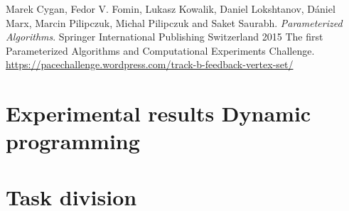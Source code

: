 \documentclass[a4paper,10pt]{article}
\begin{document}

\begin{thebibliography}{9}
 Marek Cygan, Fedor V. Fomin, Lukasz Kowalik, Daniel Lokshtanov, Dániel Marx, Marcin Pilipczuk, Michal Pilipczuk and Saket Saurabh. \textit{Parameterized Algorithms}. Springer International Publishing Switzerland 2015
 The first Parameterized Algorithms and Computational Experiments Challenge. \url{https://pacechallenge.wordpress.com/track-b-feedback-vertex-set/}
\end{thebibliography}

\clearpage
\appendix

%

\FloatBarrier
\section{Experimental results Dynamic programming} \label{app:dynamicprogram}


\FloatBarrier
\section{Task division}

\end{document}
